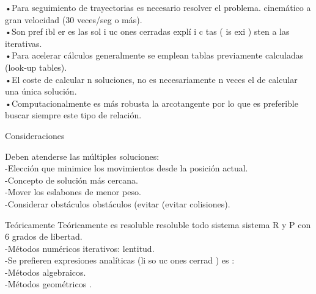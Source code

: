 \documentclass[12pt,letterpaper]{report}
\begin{document}
\begin{center}
\begin{flushleft}
\begin{flushleft}
\begin{flushleft}
\begin{flushleft}
\begin{flushleft}
\begin{flushleft}
\begin{flushleft}
\begin{flushleft}
\begin{center}
\begin{flushleft}
\begin{flushleft}
•Para seguimiento de trayectorias es necesario resolver el problema.
cinemático a gran velocidad (30 veces/seg o más).\\
•Son pref ibl er es las sol i uc ones cerradas explí i c tas ( is exi ) sten a las
iterativas.\\
•Para acelerar cálculos generalmente se emplean tablas previamente
calculadas (look‐up tables).\\
•El coste de calcular n soluciones, no es necesariamente n veces el de
calcular una única solución.\\
•Computacionalmente es más robusta la arcotangente por lo que es
preferible buscar siempre este tipo de relación.
\begin{flushleft}
Consideraciones
\begin{flushleft}
Deben atenderse las múltiples soluciones:\\
-Elección que minimice los movimientos desde la posición
actual.\\
-Concepto de solución más cercana.\\
-Mover los eslabones de menor peso.\\
-Considerar obstáculos obstáculos (evitar (evitar colisiones).
\begin{flushleft}
Teóricamente Teóricamente es resoluble resoluble todo sistema sistema R y P con 6 grados de
libertad.\\
-Métodos numéricos iterativos: lentitud.\\
-Se prefieren expresiones analíticas (li so uc ones cerrad ) es :\\
-Métodos algebraicos.\\
-Métodos geométricos .
\end{flushleft}
\end{flushleft}
\end{flushleft}
\end{flushleft}
\end{flushleft}
\end{center}
\end{flushleft}
\end{flushleft}
\end{flushleft}

\end{flushleft}
\end{flushleft}
\end{flushleft}
\end{flushleft}
\end{flushleft}
\end{center}
\end{document}
